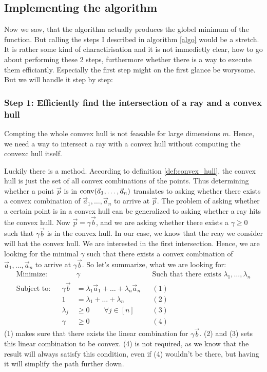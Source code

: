 \subsection{Implementing the algorithm}
Now we saw, that the algorithm actually produces the globel minimum of the function. But calling the steps I described in algorithm \ref{algo} would be a stretch. It is rather some kind of charactirisation and it is not immedietly clear, how to go about performing these 2 steps, furthermore whether there is a way to execute them efficiantly. Especially the first step might on the first glance be worysome. But we will handle it step by step:

\subsubsection{Step 1: Efficiently find the intersection of a ray and a convex hull}
Compting the whole comvex hull is not feasable for large dimensions $m$. Hence, we need a way to intersect a ray with a convex hull without computing the convexc hull itself.

Luckily there is a method. According to definition \ref{def:convex_hull}, the convex hull is just the set of all convex combinations of the points. Thus determining whether a point $\vec p$ is in $\operatorname{conv}(\vec a_1, \dots, \vec a_n)$ translates to asking whether there exists a convex combination of $\vec a_1, \dots, \vec a_n$ to arrive at $\vec p$. The problem of asking whether a certain point is in a convex hull can be generalized to asking whether a ray hits the convex hull. Now $\vec p = \gamma \vec b$, and we are asking whether there exists a $\gamma \geq 0$ such that $\gamma\vec b$ is in the convex hull. In our case, we know that the reay we consider will hat the convex hull. We are interested in the first intersection. Hence, we are looking for the minimal $\gamma$ such that there exists a convex combination of $\vec a_1, \dots, \vec a_n$ to arrive at $\gamma\vec b$. So let's summarize, what we are looking for:
\begin{align*}
    \text{Minimize:}&&&\gamma  &&\text{Such that there exists } \lambda_1, \dots, \lambda_n\\
    \text{Subject to:}&&\gamma \vec b &=\lambda_1\vec a_1 + \dots  + \lambda_n\vec a_n &&(1)\\
    && 1 &= \lambda_1 + \dots + \lambda_n &&(2)\\
    && \lambda_j &\geq 0\qquad \forall j\in[n] &&(3)\\
    && \gamma &\geq 0 &&(4)
\end{align*}
(1) makes sure that there exists the linear combination for $\gamma\vec b$. (2) and (3) sets this linear combination to be convex. (4) is not required, as we know that the result will always satisfy this condition, even if (4) wouldn't be there, but having it will simplify the path further down. 

